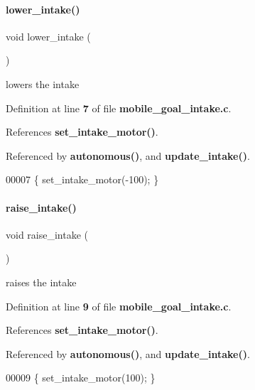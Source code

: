 \paragraph{lower\+\_\+intake()}
{\footnotesize\ttfamily void lower\+\_\+intake (\begin{DoxyParamCaption}{ }\end{DoxyParamCaption})}



lowers the intake 



Definition at line \textbf{ 7} of file \textbf{ mobile\+\_\+goal\+\_\+intake.\+c}.



References \textbf{ set\+\_\+intake\+\_\+motor()}.



Referenced by \textbf{ autonomous()}, and \textbf{ update\+\_\+intake()}.


\begin{DoxyCode}
00007 \{ set_intake_motor(-100); \}
\end{DoxyCode}
\mbox{\label{a00047_aa46a9341d1eb7b39a2ef4cc5079ee3ca}} 
\paragraph{raise\+\_\+intake()}
{\footnotesize\ttfamily void raise\+\_\+intake (\begin{DoxyParamCaption}{ }\end{DoxyParamCaption})}



raises the intake 



Definition at line \textbf{ 9} of file \textbf{ mobile\+\_\+goal\+\_\+intake.\+c}.



References \textbf{ set\+\_\+intake\+\_\+motor()}.



Referenced by \textbf{ autonomous()}, and \textbf{ update\+\_\+intake()}.


\begin{DoxyCode}
00009 \{ set_intake_motor(100); \}
\end{DoxyCode}
\mbox{\label{a00047_ab31e12bb0fa46c77906a048666b699d5}} 
